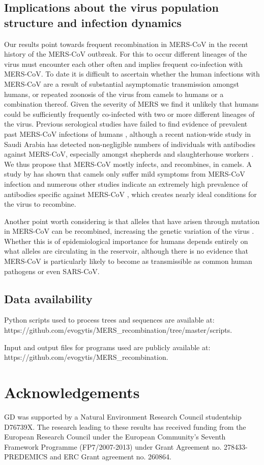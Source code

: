 \documentclass[11pt,oneside,letterpaper]{article}
\begin{document}
\subsection*{Implications about the virus population structure and infection dynamics}
Our results point towards frequent recombination in MERS-CoV in the recent history of the MERS-CoV outbreak.
For this to occur different lineages of the virus must encounter each other often and implies frequent co-infection with MERS-CoV.
To date it is difficult to ascertain whether the human infections with MERS-CoV are a result of substantial asymptomatic transmission amongst humans, or repeated zoonosis of the virus from camels to humans or a combination thereof.
Given the severity of MERS we find it unlikely that humans could be sufficiently frequently co-infected with two or more different lineages of the virus.
Previous serological studies have failed to find evidence of prevalent past MERS-CoV infections of humans \citep{gierer_2013,aburizaiza_2013}, although a recent nation-wide study in Saudi Arabia has detected non-negligible numbers of individuals with antibodies against MERS-CoV, especially amongst shepherds and slaughterhouse workers \citep{muller_2015}.
We thus propose that MERS-CoV mostly infects, and recombines, in camels.
A study by  \cite{adney_2014} has shown that camels only suffer mild symptoms from MERS-CoV infection and numerous other studies indicate an extremely high prevalence of antibodies specific against MERS-CoV \citep{muller_2014,corman_antibodies_2014,chu_2014,reusken_2013,reusken_2014}, which creates nearly ideal conditions for the virus to recombine.

Another point worth considering is that alleles that have arisen through mutation in MERS-CoV can be recombined, increasing the genetic variation of the virus \citep{muller_1932}.
Whether this is of epidemiological importance for humans depends entirely on what alleles are circulating in the reservoir, although there is no evidence that MERS-CoV is particularly likely to become as transmissible as common human pathogens or even SARS-CoV.

\subsection*{Data availability}
Python scripts used to process trees and sequences are available at:
\\https://github.com/evogytis/MERS\_recombination/tree/master/scripts.

Input and output files for programs used are publicly available at:
\\https://github.com/evogytis/MERS\_recombination.

\section*{Acknowledgements}
GD was supported by a Natural Environment Research Council studentship D76739X.
The research leading to these results has received funding from the European Research Council under the European Community's Seventh Framework Programme (FP7/2007-2013) under Grant Agreement no. 278433-PREDEMICS and ERC Grant agreement no. 260864.



\end{document}
